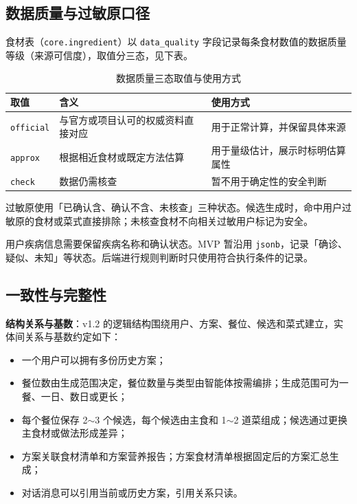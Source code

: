 \documentclass[12pt,a4paper]{ctexart}
\begin{document}
\subsection{数据质量与过敏原口径}

食材表（\texttt{core.ingredient}）以 \texttt{data\_quality} 字段记录每条食材数值的数据质量等级（来源可信度），取值分三态，见下表。

\begin{xltabular}{\linewidth}{P{1.8cm}Q{4.0cm}L}
\caption{数据质量三态取值与使用方式} \\
\toprule
\textbf{取值} & \textbf{含义} & \textbf{使用方式} \\
\midrule
\endhead
\texttt{official} & 与官方或项目认可的权威资料直接对应 & 用于正常计算，并保留具体来源 \\
\texttt{approx} & 根据相近食材或既定方法估算 & 用于量级估计，展示时标明估算属性 \\
\texttt{check} & 数据仍需核查 & 暂不用于确定性的安全判断 \\
\bottomrule
\end{xltabular}

过敏原使用「已确认含、确认不含、未核查」三种状态。候选生成时，命中用户过敏原的食材或菜式直接排除；未核查食材不向相关过敏用户标记为安全。

用户疾病信息需要保留疾病名称和确认状态。MVP 暂沿用 \texttt{jsonb}，记录「确诊、疑似、未知」等状态。后端进行规则判断时只使用符合执行条件的记录。

\subsection{一致性与完整性}

\textbf{结构关系与基数}：v1.2 的逻辑结构围绕用户、方案、餐位、候选和菜式建立，实体间关系与基数约定如下：

\begin{itemize}
\item 一个用户可以拥有多份历史方案；
\item 餐位数由生成范围决定，餐位数量与类型由智能体按需编排；生成范围可为一餐、一日、数日或更长；
\item 每个餐位保存 2$\sim$3 个候选，每个候选由主食和 1$\sim$2 道菜组成；候选通过更换主食材或做法形成差异；
\item 方案关联食材清单和方案营养报告；方案食材清单根据固定后的方案汇总生成；
\item 对话消息可以引用当前或历史方案，引用关系只读。
\end{itemize}
\end{document}
